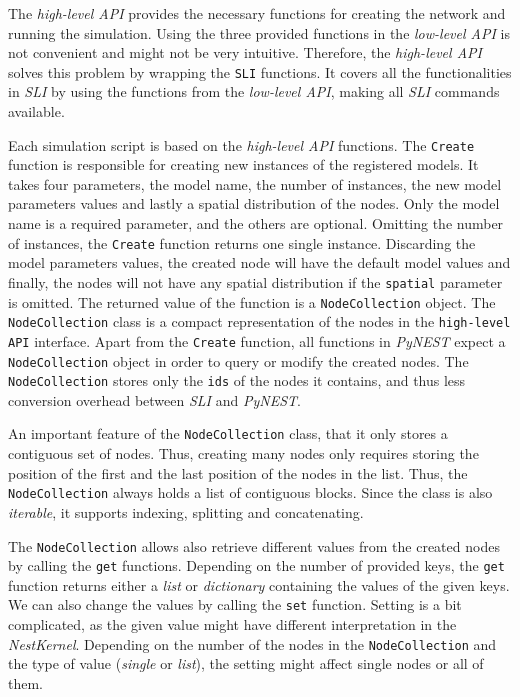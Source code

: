  The \emph{high-level API} provides the necessary functions for creating the network and running the simulation. Using the three provided functions in the \emph{low-level API} is not convenient and might not be very intuitive. Therefore, the \emph{high-level API} solves this problem by wrapping the \texttt{SLI} functions. It covers all the functionalities in \emph{SLI} by using the functions from the \emph{low-level API}, making all \emph{SLI} commands available.
 
 Each simulation script is based on the \emph{high-level API} functions. The \texttt{Create} function is responsible for creating new instances of the registered models. It takes four parameters, the model name, the number of instances, the new model parameters values and lastly a spatial distribution of the nodes. Only the model name is a required parameter, and the others are optional. Omitting the number of instances, the \texttt{Create} function returns one single instance. Discarding the model parameters values, the created node will have the default model values and finally, the nodes will not have any spatial distribution if the \texttt{spatial} parameter is omitted. The returned value of the function is a \texttt{NodeCollection} object. The \texttt{NodeCollection} class is a compact representation of the nodes in the \texttt{high-level API} interface. Apart from the \texttt{Create} function, all functions in \emph{PyNEST} expect a \texttt{NodeCollection} object in order to query or modify the created nodes. The \texttt{NodeCollection} stores only the \texttt{ids} of the nodes it contains, and thus less conversion overhead between \emph{SLI} and \emph{PyNEST}. 



An important feature of the \texttt{NodeCollection} class, that it only stores a contiguous set of nodes. Thus, creating many nodes only requires storing the position of the first and the last position of the nodes in the list. Thus, the \texttt{NodeCollection} always holds a list of contiguous blocks. Since the class is also \emph{iterable}, it supports indexing, splitting and concatenating.  


The \texttt{NodeCollection} allows also retrieve different values from the created nodes by calling the \texttt{get} functions. Depending on the number of provided keys, the \texttt{get} function returns either a \emph{list} or \emph{dictionary} containing the values of the given keys. We can also change the values by calling the \texttt{set} function. Setting is a bit complicated, as the given value might have different interpretation in the \emph{NestKernel}. Depending on the number of the nodes in the \texttt{NodeCollection} and the type of value (\emph{single} or \emph{list}), the setting might affect single nodes or all of them.

